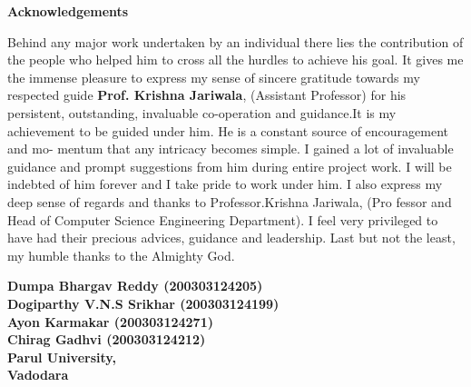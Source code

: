 \thispagestyle{empty}
\newpage
\cleardoublepage{}
{}
\begin{center}
{\Large \bf Acknowledgements}\\
\end{center}
\vspace{10pt}
\begin{flushright}
\end{flushright}


Behind any major work undertaken by an individual there lies the contribution of the people
who helped him to cross all the hurdles to achieve his goal. It gives me the immense pleasure to
express my sense of sincere gratitude towards my respected guide \textbf{Prof. Krishna Jariwala},
(Assistant Professor) for his persistent, outstanding, invaluable co-operation and guidance.It is my
achievement to be guided under him. He is a constant source of encouragement and mo- mentum
that any intricacy becomes simple. I gained a lot of invaluable guidance and prompt suggestions
from him during entire project work. I will be indebted of him forever and I take pride to work
under him. I also express my deep sense of regards and thanks to Professor.Krishna Jariwala, (Pro
fessor and Head of Computer Science Engineering Department). I feel very privileged to have had
their precious advices, guidance and leadership. Last but not the least, my humble thanks to the
Almighty God.


\vspace{1.5cm}
\begin{flushright}
\textbf{Dumpa Bhargav Reddy (200303124205) \\ Dogiparthy V.N.S Srikhar (200303124199) \\ Ayon Karmakar (200303124271) \\ Chirag Gadhvi (200303124212) \\ Parul University, \\ Vadodara}\\ 
\end{flushright}